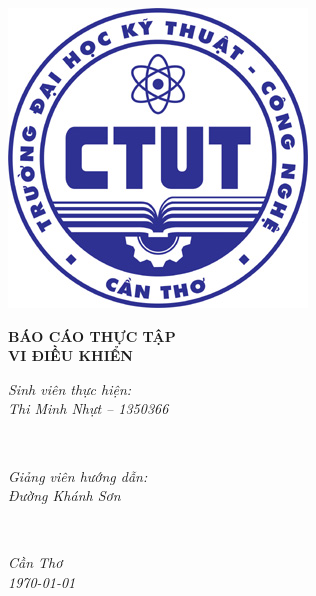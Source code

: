 \begin{titlepage}
	\newcommand{\HRule}{\rule{.375\linewidth}{0.25mm}}
	\centering
	\includegraphics[width=.3\textwidth]{CTUT_logo}\par\vspace{2.5cm}
	{\LARGE \textbf{BÁO CÁO THỰC TẬP\\VI ĐIỀU KHIỂN}\vspace{.5cm}\par}
	\vspace{2.5cm}

\begin{minipage}{0.5\textwidth}
\begin{flushleft} \large
\emph{Sinh viên thực hiện:} \\
\emph{Thi Minh Nhựt -- 1350366}
\end{flushleft}
\end{minipage}
~
\begin{minipage}{0.4\textwidth}
\begin{flushright} \large
\emph{Giảng viên hướng dẫn:}\\
\emph{Đường Khánh Sơn}
\end{flushright}
\end{minipage}\\[4cm]	
	\vfill
	
	
	\vfill
	
	{\large \textit{Cần Thơ\\\today}\par}
\end{titlepage}